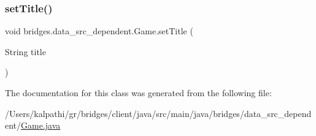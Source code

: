 \mbox{\label{classbridges_1_1data__src__dependent_1_1_game_a0c87151b75bc10357aa6829ebfc0cae3}} 
\subsubsection{\texorpdfstring{set\+Title()}{setTitle()}}
{\footnotesize\ttfamily void bridges.\+data\+\_\+src\+\_\+dependent.\+Game.\+set\+Title (\begin{DoxyParamCaption}\item[{String}]{title }\end{DoxyParamCaption})}



The documentation for this class was generated from the following file\+:\begin{DoxyCompactItemize}
\item 
/\+Users/kalpathi/gr/bridges/client/java/src/main/java/bridges/data\+\_\+src\+\_\+dependent/\mbox{\hyperlink{_game_8java}{Game.\+java}}\end{DoxyCompactItemize}
